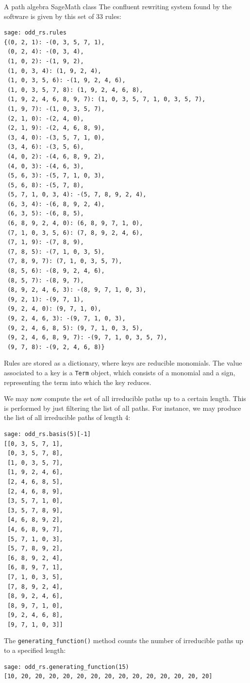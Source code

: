 \begin{chapter}{A path algebra SageMath class}
The confluent rewriting system found by the software is given by this set of 33 rules:
\begin{lstlisting}
sage: odd_rs.rules
{(0, 2, 1): -(0, 3, 5, 7, 1),
 (0, 2, 4): -(0, 3, 4),
 (1, 0, 2): -(1, 9, 2),
 (1, 0, 3, 4): (1, 9, 2, 4),
 (1, 0, 3, 5, 6): -(1, 9, 2, 4, 6),
 (1, 0, 3, 5, 7, 8): (1, 9, 2, 4, 6, 8),
 (1, 9, 2, 4, 6, 8, 9, 7): (1, 0, 3, 5, 7, 1, 0, 3, 5, 7),
 (1, 9, 7): -(1, 0, 3, 5, 7),
 (2, 1, 0): -(2, 4, 0),
 (2, 1, 9): -(2, 4, 6, 8, 9),
 (3, 4, 0): -(3, 5, 7, 1, 0),
 (3, 4, 6): -(3, 5, 6),
 (4, 0, 2): -(4, 6, 8, 9, 2),
 (4, 0, 3): -(4, 6, 3),
 (5, 6, 3): -(5, 7, 1, 0, 3),
 (5, 6, 8): -(5, 7, 8),
 (5, 7, 1, 0, 3, 4): -(5, 7, 8, 9, 2, 4),
 (6, 3, 4): -(6, 8, 9, 2, 4),
 (6, 3, 5): -(6, 8, 5),
 (6, 8, 9, 2, 4, 0): (6, 8, 9, 7, 1, 0),
 (7, 1, 0, 3, 5, 6): (7, 8, 9, 2, 4, 6),
 (7, 1, 9): -(7, 8, 9),
 (7, 8, 5): -(7, 1, 0, 3, 5),
 (7, 8, 9, 7): (7, 1, 0, 3, 5, 7),
 (8, 5, 6): -(8, 9, 2, 4, 6),
 (8, 5, 7): -(8, 9, 7),
 (8, 9, 2, 4, 6, 3): -(8, 9, 7, 1, 0, 3),
 (9, 2, 1): -(9, 7, 1),
 (9, 2, 4, 0): (9, 7, 1, 0),
 (9, 2, 4, 6, 3): -(9, 7, 1, 0, 3),
 (9, 2, 4, 6, 8, 5): (9, 7, 1, 0, 3, 5),
 (9, 2, 4, 6, 8, 9, 7): -(9, 7, 1, 0, 3, 5, 7),
 (9, 7, 8): -(9, 2, 4, 6, 8)}
\end{lstlisting}
Rules are stored as a dictionary, where keys are reducible monomials. The value associated to a key is a \texttt{Term} object, which consists of a monomial and a sign, representing the term into which the key reduces.

We may now compute the set of all irreducible paths up to a certain length. This is performed by just filtering the list of all paths. For instance, we may produce the list of all irreducible paths of length 4:
\begin{lstlisting}
sage: odd_rs.basis(5)[-1]
[[0, 3, 5, 7, 1],
 [0, 3, 5, 7, 8],
 [1, 0, 3, 5, 7],
 [1, 9, 2, 4, 6],
 [2, 4, 6, 8, 5],
 [2, 4, 6, 8, 9],
 [3, 5, 7, 1, 0],
 [3, 5, 7, 8, 9],
 [4, 6, 8, 9, 2],
 [4, 6, 8, 9, 7],
 [5, 7, 1, 0, 3],
 [5, 7, 8, 9, 2],
 [6, 8, 9, 2, 4],
 [6, 8, 9, 7, 1],
 [7, 1, 0, 3, 5],
 [7, 8, 9, 2, 4],
 [8, 9, 2, 4, 6],
 [8, 9, 7, 1, 0],
 [9, 2, 4, 6, 8],
 [9, 7, 1, 0, 3]]
\end{lstlisting}
The \texttt{generating\_function()} method counts the number of irreducible paths up to a specified length:
\begin{lstlisting}
sage: odd_rs.generating_function(15)
[10, 20, 20, 20, 20, 20, 20, 20, 20, 20, 20, 20, 20, 20, 20]
\end{lstlisting}


\end{chapter}
